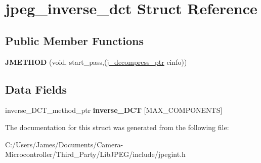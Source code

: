 \hypertarget{structjpeg__inverse__dct}{}\section{jpeg\+\_\+inverse\+\_\+dct Struct Reference}
\label{structjpeg__inverse__dct}
\subsection*{Public Member Functions}
\begin{DoxyCompactItemize}
\item 
\mbox{\label{structjpeg__inverse__dct_a49e08839ba93659b8c4dae80ec9f4252}} 
{\bfseries J\+M\+E\+T\+H\+OD} (void, start\+\_\+pass,(\hyperlink{structjpeg__decompress__struct}{j\+\_\+decompress\+\_\+ptr} cinfo))
\end{DoxyCompactItemize}
\subsection*{Data Fields}
\begin{DoxyCompactItemize}
\item 
\mbox{\label{structjpeg__inverse__dct_a2eb2aa1d2c9173a4e0c6cad4e17a2072}} 
inverse\+\_\+\+D\+C\+T\+\_\+method\+\_\+ptr {\bfseries inverse\+\_\+\+D\+CT} \mbox{[}M\+A\+X\+\_\+\+C\+O\+M\+P\+O\+N\+E\+N\+TS\mbox{]}
\end{DoxyCompactItemize}


The documentation for this struct was generated from the following file\+:\begin{DoxyCompactItemize}
\item 
C\+:/\+Users/\+James/\+Documents/\+Camera-\/\+Microcontroller/\+Third\+\_\+\+Party/\+Lib\+J\+P\+E\+G/include/jpegint.\+h\end{DoxyCompactItemize}
